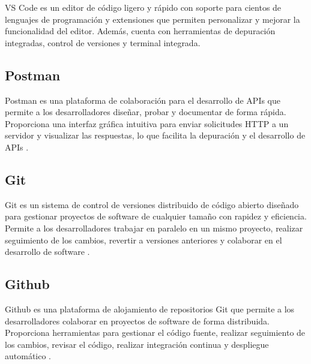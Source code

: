 VS Code es un editor de código ligero y rápido con soporte para cientos de
lenguajes de programación y extensiones que permiten personalizar y mejorar la
funcionalidad del editor. Además, cuenta con herramientas de depuración
integradas, control de versiones y terminal integrada.

\subsection{Postman}

Postman es una plataforma de colaboración para el desarrollo de APIs que
permite a los desarrolladores diseñar, probar y documentar de forma rápida.
Proporciona una interfaz gráfica intuitiva para enviar solicitudes HTTP a un
servidor y visualizar las respuestas, lo que facilita la depuración y el
desarrollo de APIs \cite{Postman}.

\subsection{Git}

Git es un sistema de control de versiones distribuido de código abierto
diseñado para gestionar proyectos de software de cualquier tamaño con rapidez y
eficiencia. Permite a los desarrolladores trabajar en paralelo en un mismo
proyecto, realizar seguimiento de los cambios, revertir a versiones anteriores
y colaborar en el desarrollo de software \cite{Git}.

\subsection{Github}

Github es una plataforma de alojamiento de repositorios Git que permite a los
desarrolladores colaborar en proyectos de software de forma distribuida.
Proporciona herramientas para gestionar el código fuente, realizar seguimiento
de los cambios, revisar el código, realizar integración continua y despliegue
automático \cite{Github}.

